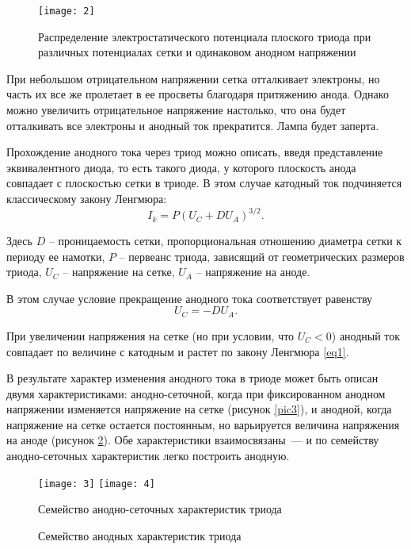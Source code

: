 \begin{figure}[ht]
  \center
  \texttt{[image: 2]}
  \caption{Распределение электростатического потенциала плоского триода при
  различных потенциалах сетки и одинаковом анодном напряжении}
  \label{pic2}
\end{figure}

При небольшом отрицательном напряжении сетка отталкивает электроны, но часть их
все же пролетает в ее просветы благодаря притяжению анода. Однако можно
увеличить отрицательное напряжение настолько, что она будет отталкивать все
электроны и анодный ток прекратится. Лампа будет заперта.

Прохождение анодного тока через триод можно описать, введя представление
эквивалентного диода, то есть такого диода, у которого плоскость анода
совпадает с плоскостью сетки в триоде. В этом случае катодный ток подчиняется
классическому закону Ленгмюра:
\begin{equation}
  I_k = P(U_C + DU_A)^{3/2}.
  \label{eq1}
\end{equation}

Здесь \( D \) -- проницаемость сетки, пропорциональная отношению диаметра сетки
к периоду ее намотки, \( P \) -- первеанс триода, зависящий от геометрических
размеров триода, \( U_C \) -- напряжение на сетке, \( U_A \) -- напряжение на
аноде.

В этом случае условие прекращение анодного тока соответствует равенству
\begin{equation}
  U_C = -DU_A.
  \label{eq2}
\end{equation}

При увеличении напряжения на сетке (но при условии, что \( U_C < 0 \)) анодный
ток совпадает по величине с катодным и растет по закону Ленгмюра \eqref{eq1}.

В результате характер изменения анодного тока в триоде может быть описан двумя
характеристиками: анодно-сеточной, когда при фиксированном анодном напряжении
изменяется напряжение на сетке (рисунок \ref{pic3}), и анодной, когда
напряжение на сетке остается постоянным, но варьируется величина напряжения на
аноде (рисунок \ref{pic4}). Обе характеристики взаимосвязаны~--- и по семейству
анодно-сеточных характеристик легко построить анодную.

\begin{figure}[ht]
  \center
  \texttt{[image: 3]} \hspace{2em}
  \texttt{[image: 4]}
  \parbox{.45\textwidth}{\caption{Семейство анодно-сеточных характеристик
  триода}\label{pic3}} \hspace{2em}
  \parbox{.45\textwidth}{\caption{Семейство анодных характеристик триода}
  \label{pic4}}
\end{figure}

